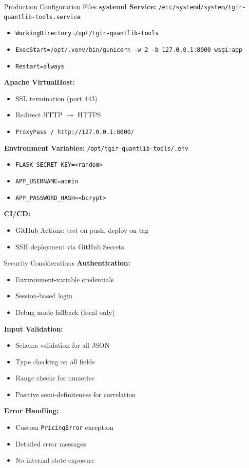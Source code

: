 \documentclass[aspectratio=169,11pt]{beamer}
\begin{document}
\begin{frame}{Production Configuration Files}
\textbf{systemd Service:} \texttt{/etc/systemd/system/tgir-quantlib-tools.service}
\begin{itemize}
    \item \texttt{WorkingDirectory=/opt/tgir-quantlib-tools}
    \item \texttt{ExecStart=/opt/.venv/bin/gunicorn -w 2 -b 127.0.0.1:8000 wsgi:app}
    \item \texttt{Restart=always}
\end{itemize}

\textbf{Apache VirtualHost:}
\begin{itemize}
    \item SSL termination (port 443)
    \item Redirect HTTP $\to$ HTTPS
    \item \texttt{ProxyPass / http://127.0.0.1:8000/}
\end{itemize}

\textbf{Environment Variables:} \texttt{/opt/tgir-quantlib-tools/.env}
\begin{itemize}
    \item \texttt{FLASK\_SECRET\_KEY=<random>}
    \item \texttt{APP\_USERNAME=admin}
    \item \texttt{APP\_PASSWORD\_HASH=<bcrypt>}
\end{itemize}

\textbf{CI/CD:}
\begin{itemize}
    \item GitHub Actions: test on push, deploy on tag
    \item SSH deployment via GitHub Secrets
\end{itemize}
\end{frame}

\begin{frame}{Security Considerations}
\textbf{Authentication:}
\begin{itemize}
    \item Environment-variable credentials
    \item Session-based login
    \item Debug mode fallback (local only)
\end{itemize}

\textbf{Input Validation:}
\begin{itemize}
    \item Schema validation for all JSON
    \item Type checking on all fields
    \item Range checks for numerics
    \item Positive semi-definiteness for correlation
\end{itemize}

\textbf{Error Handling:}
\begin{itemize}
    \item Custom \texttt{PricingError} exception
    \item Detailed error messages
    \item No internal state exposure
\end{itemize}
\end{frame}
\end{document}
